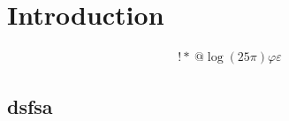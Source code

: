 \chapter{Introduction}

\begin{align}
    !*~@ \log \left( 25 \pi \right) \varphi \varepsilon
\end{align}

\lipsum[2-20]
\section{dsfsa}
\lipsum[2-20]